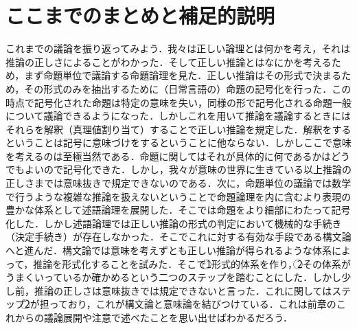\documentclass[10pt,b5paper,papersize,dvipdfmx]{jsbook}
\newcommand\maru[1]{\textcircled{\scriptsize{}#1}}
\begin{document}
\section{ここまでのまとめと補足的説明}
これまでの議論を振り返ってみよう．我々は正しい論理とは何かを考え，それは推論の正しさによることがわかった．そして正しい推論とはなにかを考えるため，まず命題単位で議論する命題論理を見た．正しい推論はその形式で決まるため，その形式のみを抽出するために（日常言語の）命題の記号化を行った．この時点で記号化された命題は特定の意味を失い，同様の形で記号化される命題一般について議論できるようになった．しかしこれを用いて推論を議論するときにはそれらを解釈（真理値割り当て）することで正しい推論を規定した．解釈をするということは記号に意味づけをするということに他ならない．しかしここで意味を考えるのは至極当然である．命題に関してはそれが具体的に何であるかはどうでもよいので記号化できた．しかし，我々が意味の世界に生きている以上推論の正しさまでは意味抜きで規定できないのである．次に，命題単位の議論では数学で行うような複雑な推論を扱えないということで命題論理を内に含むより表現の豊かな体系として述語論理を展開した．そこでは命題をより細部にわたって記号化した．しかし述語論理では正しい推論の形式の判定において機械的な手続き（決定手続き）が存在しなかった．そこでこれに対する有効な手段である構文論へと進んだ．構文論では意味を考えずとも正しい推論が得られるような体系によって，推論を形式化することを試みた．そこで\maru{1}形式的体系を作り，\maru{2}その体系がうまくいっているか確かめるという二つのステップを踏むことにした．しかし少し前，推論の正しさは意味抜きでは規定できないと言った．これに関してはステップ\maru{2}が担っており，これが構文論と意味論を結びつけている．これは前章のこれからの議論展開や注意で述べたことを思い出せばわかるだろう．
\end{document}
